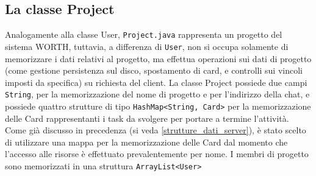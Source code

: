 \documentclass{article}
\begin{document}
\subsection{La classe Project}
Analogamente alla classe User, \texttt{Project.java} rappresenta un progetto del sistema WORTH, tuttavia, a differenza di \texttt{User}, non si occupa solamente di memorizzare i dati relativi al progetto, ma effettua operazioni sui dati di progetto (come gestione persistenza sul disco, spostamento di card, e controlli sui vincoli imposti da specifica) su richiesta del client.
La classe Project possiede due campi \texttt{String}, per la memorizzazione del nome di progetto e per l'indirizzo della chat, e possiede quattro strutture di tipo \texttt{HashMap<String, Card>} per la memorizzazione delle Card rappresentanti i task da svolgere per portare a termine l'attività. Come già discusso in precedenza (si veda \ref{strutture_dati_server}), è stato scelto di utilizzare una mappa per la memorizzazione delle Card dal momento che l'accesso alle risorse è effettuato prevalentemente per nome. I membri di progetto sono memorizzati in una struttura \texttt{ArrayList<User>}
\end{document}
